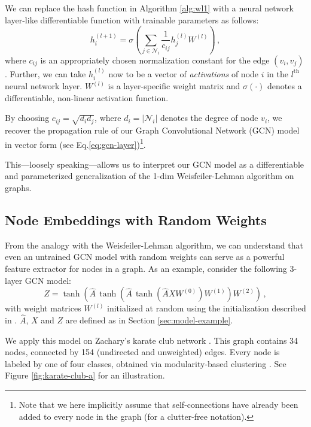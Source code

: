 \documentclass{article} %
\makeatletter
\newcommand*{\eq}{Eq.\@\xspace}
\makeatother
\begin{document}
We can replace the hash function in Algorithm \ref{alg:wl1} with a neural network layer-like differentiable function with trainable parameters as follows:
\begin{equation}
  h^{(l+1)}_i = \sigma \left( \sum_{j\in\mathcal{N}_i} \frac{1}{c_{ij}}h^{(l)}_jW^{(l)} \right) \, ,
\label{eq:diff-model}
\end{equation}
where $c_{ij}$ is an appropriately chosen normalization constant for the edge $(v_i,v_j)$. Further, we can take $h^{(l)}_i$ now to be a vector of \emph{activations} of node $i$ in the $l^{\text{th}}$ neural network layer. $W^{(l)}$ is a layer-specific weight matrix and $\sigma(\cdot)$ denotes a differentiable, non-linear activation function.

By choosing $c_{ij}=\sqrt{d_i d_j}$, where $d_i=|\mathcal{N}_i|$ denotes the degree of node $v_i$, we recover the propagation rule of our Graph Convolutional Network (GCN) model in vector form (see \eq \ref{eq:gcn-layer})\footnote{Note that we here implicitly assume that self-connections have already been added to every node in the graph (for a clutter-free notation).}.

This---loosely speaking---allows us to interpret our GCN model as a differentiable and parameterized generalization of the 1-dim Weisfeiler-Lehman algorithm on graphs.

\subsection{Node Embeddings with Random Weights}
From the analogy with the Weisfeiler-Lehman algorithm, we can understand that even an untrained GCN model with random weights can serve as a powerful feature extractor for nodes in a graph. As an example, consider the following 3-layer GCN model:
\begin{equation}
Z= \tanh\!\left(\hat{A} \, \tanh\!\left(\hat{A}\,\tanh\!\left(\hat{A} X W^{(0)}\right) W^{(1)} \right) W^{(2)} \right) \, ,
\label{eq:three-layer-gcn}
\end{equation}
with weight matrices $W^{(l)}$ initialized at random using the initialization described in \cite{glorot2010understanding}. $\hat{A}$, $X$ and $Z$ are defined as in Section \ref{sec:model-example}.

We apply this model on Zachary's karate club network \citep{zachary1977information}. This graph contains 34 nodes, connected by 154 (undirected and unweighted) edges. Every node is labeled by one of four classes, obtained via modularity-based clustering \citep{brandes2008modularity}. See Figure \ref{fig:karate-club-a} for an illustration.
\end{document}

